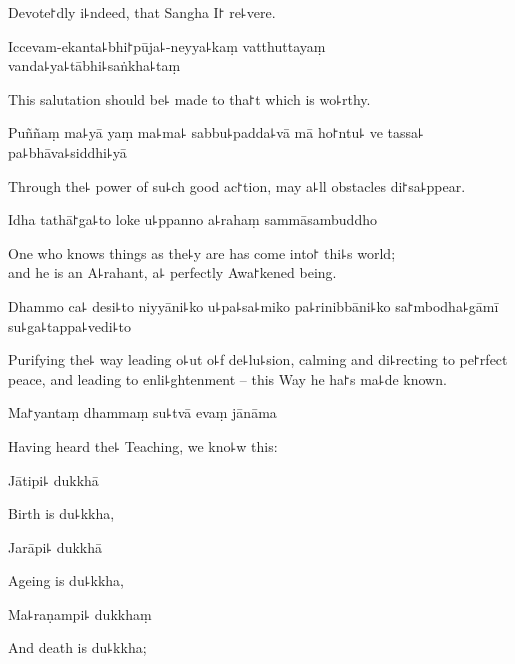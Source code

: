 \begin{english}
  Devote꜓dly i꜕ndeed, that Sangha I꜓ re꜕vere.
\end{english}

Iccevam-ekanta꜕bhi꜓pūja꜕-neyya꜕kaṃ vatthuttayaṃ \\vanda꜕ya꜕tābhi꜕saṅkha꜕taṃ

\begin{english}
  This salutation should be꜕ made to tha꜓t which is wo꜕rthy.
\end{english}

Puññaṃ ma꜕yā yaṃ ma꜕ma꜕ sabbu꜕padda꜕vā mā ho꜓ntu꜕ ve tassa꜕ pa꜕bhāva꜕siddhi꜕yā

\begin{english}
  Through the꜕ power of su꜕ch good ac꜓tion, may a꜕ll obstacles di꜓sa꜕ppear.
\end{english}

Idha tathā꜓ga꜕to loke u꜕ppanno a꜕rahaṃ sammāsambuddho

\begin{english}
  One who knows things as the꜕y are has come into꜓ thi꜕s world; \\and he is an A꜕rahant, a꜕ perfectly Awa꜓kened being.
\end{english}

Dhammo ca꜕ desi꜕to niyyāni꜕ko u꜕pa꜕sa꜕miko pa꜕rinibbāni꜕ko sa꜓mbodha꜕gāmī su꜕ga꜕tappa꜕vedi꜕to

\begin{english}
  Purifying the꜕ way leading o꜕ut o꜕f de꜕lu꜕sion, calming and di꜕recting to pe꜓rfect peace, and leading to enli꜕ghtenment -- this Way he ha꜓s ma꜕de known.
\end{english}

Ma꜓yantaṃ dhammaṃ su꜕tvā evaṃ jānāma

\begin{english}
  Having heard the꜕ Teaching, we kno꜕w this:
\end{english}

Jātipi꜕ dukkhā

\begin{english}
  Birth is du꜕kkha,
\end{english}

Jarāpi꜕ dukkhā

\begin{english}
  Ageing is du꜕kkha,
\end{english}

Ma꜕raṇampi꜕ dukkhaṃ

\begin{english}
  And death is du꜕kkha;
\end{english}

